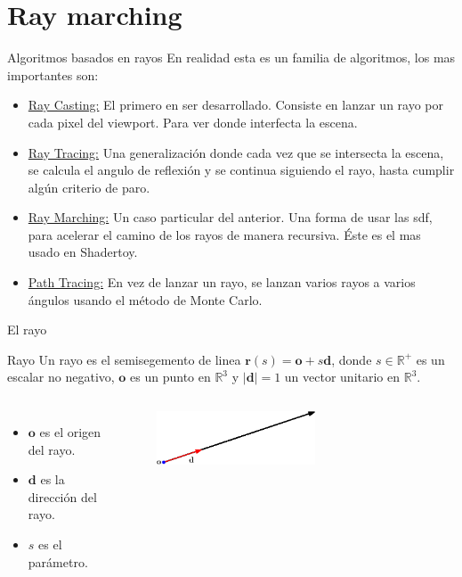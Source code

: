 \section{Ray marching}
\begin{frame}{Algoritmos basados en rayos}
En realidad esta es un familia de algoritmos, los mas importantes son:

\begin{itemize}
    \item \href{https://en.wikipedia.org/wiki/Ray_casting}{Ray Casting:} El primero en ser desarrollado. Consiste en lanzar un rayo por cada pixel del viewport. Para ver donde interfecta la escena.
    \item \href{https://en.wikipedia.org/wiki/Ray_tracing_(graphics)}{Ray Tracing:} Una generalización donde cada vez que se intersecta la escena, se calcula el angulo de reflexión y se continua siguiendo el rayo, hasta cumplir algún criterio de paro.
    \item \href{https://en.wikipedia.org/wiki/Ray_marching}{Ray Marching:} Un caso particular del anterior. Una forma de usar las sdf, para acelerar el camino de los rayos de manera recursiva. Éste es el mas usado en Shadertoy.
    \item \href{https://en.wikipedia.org/wiki/Path_tracing}{Path Tracing:} En vez de lanzar un rayo, se lanzan varios rayos a varios ángulos usando el método de Monte Carlo.
\end{itemize}

\end{frame}

\begin{frame}{El rayo}
\begin{block}{Rayo}
Un rayo es el semisegemento de linea $\mathbf{r}(s) = \mathbf{o} + s  \mathbf{d}$, donde $s \in \mathbb{R}^{+}$ es un escalar no negativo, $\mathbf{o}$ es un punto en $\mathbb{R}^3$ y $|\mathbf{d}| = 1$ un vector unitario en $\mathbb{R}^3$.

\end{block}

\begin{columns}
\begin{itemize}
    \item $\mathbf{o}$ es el origen del rayo.
    \item $\mathbf{d}$ es la dirección del rayo.
    \item $s$ es el parámetro.
\end{itemize}    
\begin{figure}[htp]
    \centering
    \includegraphics[width=0.6\textwidth]{img/ray.eps}    
\end{figure}
\end{columns}
\end{frame}

